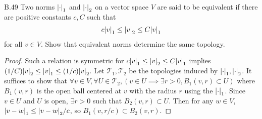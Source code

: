 \begin{customexer}{B.49}
  Two norms $\abs{\cdot}_1$ and $\abs{\cdot}_2$ on a vector space $V$ are said to be equivalent if there are positive constants $c, C$ such that
  \begin{align*}
    c\abs{v}_1 \leq \abs{v}_2 \leq C\abs{v}_1
  \end{align*}
  for all $v \in V$.
  Show that equivalent norms determine the same topology.
\end{customexer}

\begin{proof}
  Such a relation is symmetric for $c\abs{v}_1 \leq \abs{v}_2 \leq C\abs{v}_1$ implies $(1/C)\abs{v}_2 \leq \abs{v}_1 \leq (1/c)\abs{v}_2$.
  Let $\mathcal{T}_1, \mathcal{T}_2$ be the topologies induced by $\abs{\cdot}_1, \abs{\cdot}_2$.
  It suffices to show that $\forall v \in V, \forall U \in \mathcal{T}_2, (v \in U \implies \exists r > 0, B_1(v, r) \subset U)$ where $B_1(v, r)$ is the open ball centered at $v$ with the radius $r$ using the $\abs{\cdot}_1$.
  Since $v \in U$ and $U$ is open, $\exists r > 0$ such that $B_2(v, r) \subset U$.
  Then for any $w \in V$, $\abs{v - w}_1 \leq \abs{v - w}_2 / c$, so $B_1(v, r / c) \subset B_2(v, r)$.
\end{proof}
